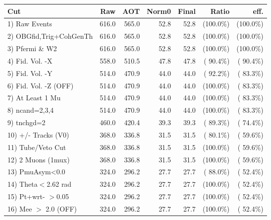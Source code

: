  \begin{table}[h!]\centering
 \begin{tabular}{||l||r|r|r|r|r|r||}
 \hline
 \hline
 Cut & Raw & AOT & Norm0 & Final & Ratio & eff.       \\
 \hline
  1) Raw Events           &        616.0 &        565.0 &         52.8 &         52.8 & (100.0\%) & (100.0\%) \\
  2) OBGfid,Trig+CohGenTh &        616.0 &        565.0 &         52.8 &         52.8 & (100.0\%) & (100.0\%) \\
  3) Pfermi \& W2         &        616.0 &        565.0 &         52.8 &         52.8 & (100.0\%) & (100.0\%) \\
  4) Fid. Vol. -X         &        558.0 &        510.5 &         47.8 &         47.8 & ( 90.4\%) & ( 90.4\%) \\
  5) Fid. Vol. -Y         &        514.0 &        470.9 &         44.0 &         44.0 & ( 92.2\%) & ( 83.3\%) \\
  6) Fid. Vol. -Z (OFF)   &        514.0 &        470.9 &         44.0 &         44.0 & (100.0\%) & ( 83.3\%) \\
  7) At Least 1 Mu        &        514.0 &        470.9 &         44.0 &         44.0 & (100.0\%) & ( 83.3\%) \\
  8) ncand=2,3,4          &        514.0 &        470.9 &         44.0 &         44.0 & (100.0\%) & ( 83.3\%) \\
  9) tnchgd=2             &        460.0 &        420.4 &         39.3 &         39.3 & ( 89.3\%) & ( 74.4\%) \\
 10) +/- Tracks (V0)      &        368.0 &        336.8 &         31.5 &         31.5 & ( 80.1\%) & ( 59.6\%) \\
 11) Tube/Veto Cut        &        368.0 &        336.8 &         31.5 &         31.5 & (100.0\%) & ( 59.6\%) \\
 12) 2 Muons (1mux)       &        368.0 &        336.8 &         31.5 &         31.5 & (100.0\%) & ( 59.6\%) \\
 13) PmuAsym<0.0          &        324.0 &        296.2 &         27.7 &         27.7 & ( 88.0\%) & ( 52.4\%) \\
 14) Theta$<$2.62 rad     &        324.0 &        296.2 &         27.7 &         27.7 & (100.0\%) & ( 52.4\%) \\
 15) Pt+wrt- $>$0.05      &        324.0 &        296.2 &         27.7 &         27.7 & (100.0\%) & ( 52.4\%) \\
 16) Mee $>$ 2.0  (OFF)   &        324.0 &        296.2 &         27.7 &         27.7 & (100.0\%) & ( 52.4\%) \\

\end{tabular}
\end{table}
